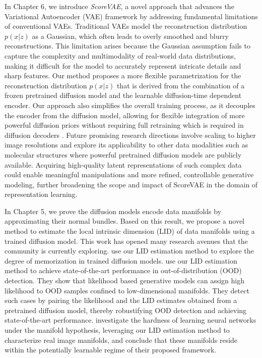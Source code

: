 In Chapter 6, we introduce \emph{ScoreVAE}, a novel approach that advances the Variational Autoencoder (VAE) framework by addressing fundamental limitations of conventional VAEs. Traditional VAEs model the reconstruction distribution $p(x|z)$ as a Gaussian, which often leads to overly smoothed and blurry reconstructions. This limitation arises because the Gaussian assumption fails to capture the complexity and multimodality of real-world data distributions, making it difficult for the model to accurately represent intricate details and sharp features. Our method proposes a more flexible parametrization for the reconstruction distribution $p(x|z)$ that is derived from the combination of a frozen pretrained diffusion model and the learnable diffusion-time dependent encoder. Our approach also simplifies the overall training process, as it decouples the encoder from the diffusion model, allowing for flexible integration of more powerful diffusion priors without requiring full retraining which is required in diffusion decoders \cite{preechakul2022diffusion_decoder}. Future promising research directions involve scaling to higher image resolutions and explore its applicability to other data modalities such as molecular structures where powerful pretrained diffusion models are publicly available. Acquiring high-quality latent representations of such complex data could enable meaningful manipulations and more refined, controllable generative modeling, further broadening the scope and impact of ScoreVAE in the domain of representation learning.

In Chapter 5, we prove the diffusion models encode data manifolds by approximating their normal bundles. Based on this result, we propose a novel method to estimate the local intrinsic dimension (LID) of data manifolds using a trained diffusion model. This work has opened many research avenues that the community is currently exploring. \citet{achilli2024losing} use our LID estimation method to explore the degree of memorization in trained diffusion models. \citet{kamkari2024geometric} use our LID estimation method to achieve state-of-the-art performance in out-of-distribution (OOD) detection. They show that likelihood based generative models can assign high likelihood to OOD samples confined to low-dimensional manifolds. They detect such cases by pairing the likelihood and the LID estimates obtained from a pretrained diffusion model, thereby robustifying OOD detection and achieving state-of-the-art performance. \citet{kiani2024hardness} investigate the hardness of learning neural networks under the manifold hypothesis, leveraging our LID estimation method to characterize real image manifolds, and conclude that these manifolds reside within the potentially learnable regime of their proposed framework. 


